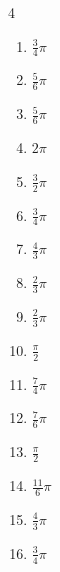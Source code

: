 \begin{multicols}{4}
\begin{enumerate}
  \item $\displaystyle \frac{3}{4}\pi$

  \item $\displaystyle \frac{5}{6}\pi$

  \item $\displaystyle \frac{5}{6}\pi$

  \item $\displaystyle 2\pi$

  \item $\displaystyle \frac{3}{2}\pi$

  \item $\displaystyle \frac{3}{4}\pi$

  \item $\displaystyle \frac{4}{3}\pi$

  \item $\displaystyle \frac{2}{3}\pi$

  \item $\displaystyle \frac{2}{3}\pi$

  \item $\displaystyle \frac{\pi}{2}$

  \item $\displaystyle \frac{7}{4}\pi$

  \item $\displaystyle \frac{7}{6}\pi$

  \item $\displaystyle \frac{\pi}{2}$

  \item $\displaystyle \frac{11}{6}\pi$

  \item $\displaystyle \frac{4}{3}\pi$

  \item $\displaystyle \frac{3}{4}\pi$


\end{enumerate}
\end{multicols}
